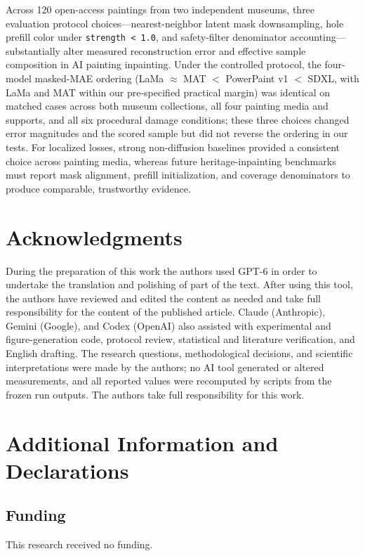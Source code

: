 \documentclass[fleqn,12pt,lineno]{wlpeerj}
\begin{document}
Across 120 open-access paintings from two independent museums, three evaluation protocol choices---nearest-neighbor latent mask downsampling, hole prefill color under \texttt{strength\ \textless{}\ 1.0}, and safety-filter denominator accounting---substantially alter measured reconstruction error and effective sample composition in AI painting inpainting. Under the controlled protocol, the four-model masked-MAE ordering (LaMa \(\approx\) MAT \(\!<\!\) PowerPaint v1 \(\!<\!\) SDXL, with LaMa and MAT within our pre-specified practical margin) was identical on matched cases across both museum collections, all four painting media and supports, and all six procedural damage conditions; these three choices changed error magnitudes and the scored sample but did not reverse the ordering in our tests. For localized losses, strong non-diffusion baselines provided a consistent choice across painting media, whereas future heritage-inpainting benchmarks must report mask alignment, prefill initialization, and coverage denominators to produce comparable, trustworthy evidence.

\FloatBarrier

\section*{Acknowledgments}

During the preparation of this work the authors used GPT-6 in order to undertake the translation and polishing of part of the text. After using this tool, the authors have reviewed and edited the content as needed and take full responsibility for the content of the published article. Claude (Anthropic), Gemini (Google), and Codex (OpenAI) also assisted with experimental and figure-generation code, protocol review, statistical and literature verification, and English drafting. The research questions, methodological decisions, and scientific interpretations were made by the authors; no AI tool generated or altered measurements, and all reported values were recomputed by scripts from the frozen run outputs. The authors take full responsibility for this work.

\section*{Additional Information and Declarations}

\subsection*{Funding}
This research received no funding.
\end{document}
